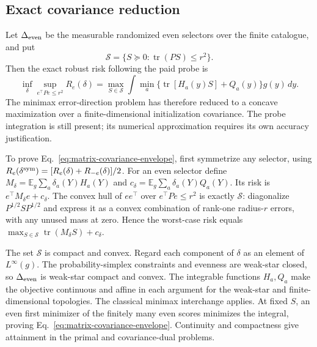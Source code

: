 \subsection{Exact covariance reduction}
Let $\Delta_{\rm even}$ be the measurable randomized even selectors over the finite catalogue, and put
\[
\mathcal S=\{S\succeq0:\operatorname{tr}(PS)\le r^2\}.
\]
Then the exact robust risk following the paid probe is
\begin{equation}
\inf_{\delta}\sup_{e^\top Pe\le r^2}R_e(\delta)
=\max_{S\in\mathcal S}\int\min_a\{\operatorname{tr}[H_a(y)S]+Q_a(y)\}g(y)\,dy.
\label{eq:matrix-covariance-envelope}
\end{equation}
The minimax error-direction problem has therefore reduced to a concave maximization over a finite-dimensional initialization covariance.
The probe integration is still present; its numerical approximation requires its own accuracy justification.

To prove Eq.~\eqref{eq:matrix-covariance-envelope}, first symmetrize any selector, using $R_e(\delta^{\rm sym})=[R_e(\delta)+R_{-e}(\delta)]/2$.
For an even selector define $M_\delta=\mathbb E_g\sum_a\delta_a(Y)H_a(Y)$ and $c_\delta=\mathbb E_g\sum_a\delta_a(Y)Q_a(Y)$.
Its risk is $e^\top M_\delta e+c_\delta$.
The convex hull of $ee^\top$ over $e^\top Pe\le r^2$ is exactly $\mathcal S$: diagonalize $P^{1/2}SP^{1/2}$ and express it as a convex combination of rank-one radius-$r$ errors, with any unused mass at zero.
Hence the worst-case risk equals $\max_{S\in\mathcal S}\operatorname{tr}(M_\delta S)+c_\delta$.

The set $\mathcal S$ is compact and convex.
Regard each component of $\delta$ as an element of $L^\infty(g)$.
The probability-simplex constraints and evenness are weak-star closed, so $\Delta_{\rm even}$ is weak-star compact and convex.
The integrable functions $H_a,Q_a$ make the objective continuous and affine in each argument for the weak-star and finite-dimensional topologies.
The classical minimax interchange applies.
At fixed $S$, an even first minimizer of the finitely many even scores minimizes the integral, proving Eq.~\eqref{eq:matrix-covariance-envelope}.
Continuity and compactness give attainment in the primal and covariance-dual problems.

